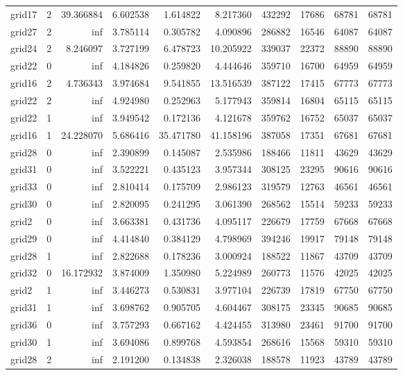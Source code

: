 \begin{longtable}{|l|r|r|r|r|r|r|r|r|r|}
grid17 & 2 & 39.366884 & 6.602538 & 1.614822 & 8.217360 & 432292 & 17686 & 68781 & 68781 \\
grid27 & 2 & inf & 3.785114 & 0.305782 & 4.090896 & 286882 & 16546 & 64087 & 64087 \\
grid24 & 2 & 8.246097 & 3.727199 & 6.478723 & 10.205922 & 339037 & 22372 & 88890 & 88890 \\
grid22 & 0 & inf & 4.184826 & 0.259820 & 4.444646 & 359710 & 16700 & 64959 & 64959 \\
grid16 & 2 & 4.736343 & 3.974684 & 9.541855 & 13.516539 & 387122 & 17415 & 67773 & 67773 \\
grid22 & 2 & inf & 4.924980 & 0.252963 & 5.177943 & 359814 & 16804 & 65115 & 65115 \\
grid22 & 1 & inf & 3.949542 & 0.172136 & 4.121678 & 359762 & 16752 & 65037 & 65037 \\
grid16 & 1 & 24.228070 & 5.686416 & 35.471780 & 41.158196 & 387058 & 17351 & 67681 & 67681 \\
grid28 & 0 & inf & 2.390899 & 0.145087 & 2.535986 & 188466 & 11811 & 43629 & 43629 \\
grid31 & 0 & inf & 3.522221 & 0.435123 & 3.957344 & 308125 & 23295 & 90616 & 90616 \\
grid33 & 0 & inf & 2.810414 & 0.175709 & 2.986123 & 319579 & 12763 & 46561 & 46561 \\
grid30 & 0 & inf & 2.820095 & 0.241295 & 3.061390 & 268562 & 15514 & 59233 & 59233 \\
grid2 & 0 & inf & 3.663381 & 0.431736 & 4.095117 & 226679 & 17759 & 67668 & 67668 \\
grid29 & 0 & inf & 4.414840 & 0.384129 & 4.798969 & 394246 & 19917 & 79148 & 79148 \\
grid28 & 1 & inf & 2.822688 & 0.178236 & 3.000924 & 188522 & 11867 & 43709 & 43709 \\
grid32 & 0 & 16.172932 & 3.874009 & 1.350980 & 5.224989 & 260773 & 11576 & 42025 & 42025 \\
grid2 & 1 & inf & 3.446273 & 0.530831 & 3.977104 & 226739 & 17819 & 67750 & 67750 \\
grid31 & 1 & inf & 3.698762 & 0.905705 & 4.604467 & 308175 & 23345 & 90685 & 90685 \\
grid36 & 0 & inf & 3.757293 & 0.667162 & 4.424455 & 313980 & 23461 & 91700 & 91700 \\
grid30 & 1 & inf & 3.694086 & 0.899768 & 4.593854 & 268616 & 15568 & 59310 & 59310 \\
grid28 & 2 & inf & 2.191200 & 0.134838 & 2.326038 & 188578 & 11923 & 43789 & 43789 \\

\end{longtable}
